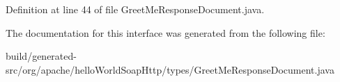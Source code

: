 Definition at line 44 of file Greet\+Me\+Response\+Document.\+java.



The documentation for this interface was generated from the following file\+:\begin{DoxyCompactItemize}
\item 
build/generated-\/src/org/apache/hello\+World\+Soap\+Http/types/Greet\+Me\+Response\+Document.\+java\end{DoxyCompactItemize}
